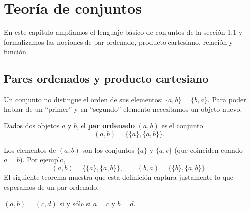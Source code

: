 \documentclass[12pt,a4paper]{book}
\begin{document}
  \chapter{Teoría de conjuntos}

  En este capítulo ampliamos el lenguaje básico de conjuntos de la sección 1.1 y formalizamos las nociones de par ordenado, producto cartesiano, relación y función.

  \section{Pares ordenados y producto cartesiano}

  Un conjunto no distingue el orden de sus elementos: $\{a,b\}=\{b,a\}$. Para poder hablar de un ``primer'' y un ``segundo'' elemento necesitamos un objeto nuevo.

  \begin{definicion}
    Dados dos objetos $a$ y $b$, el \textbf{par ordenado} $(a,b)$ es el conjunto
    \begin{equation*}
      (a,b)=\big\{\{a\},\{a,b\}\big\}.
    \end{equation*}
  \end{definicion}

  Los elementos de $(a,b)$ son los conjuntos $\{a\}$ y $\{a,b\}$ (que coinciden cuando $a=b$). Por ejemplo,
  \begin{equation*}
    (a,b)=\big\{\{a\},\{a,b\}\big\}, \qquad (b,a)=\big\{\{b\},\{a,b\}\big\}.
  \end{equation*}
  El siguiente teorema muestra que esta definición captura justamente lo que esperamos de un par ordenado.

  \begin{teorema}\label{teo:igualdad-pares}
    $(a,b)=(c,d)$ si y sólo si $a=c$ y $b=d$.
  \end{teorema}
\end{document}
